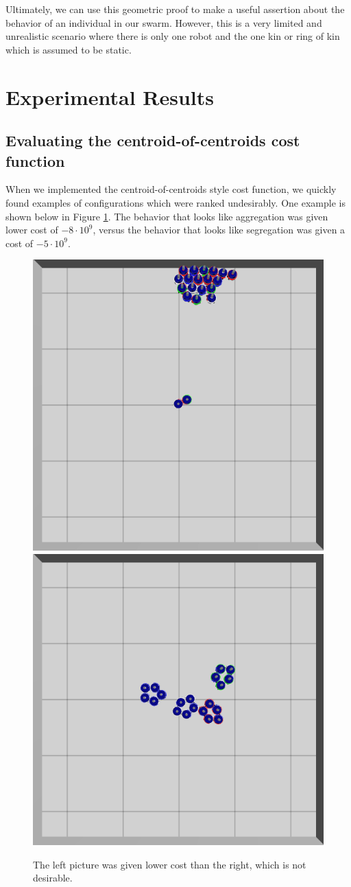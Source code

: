 \documentclass[conference]{IEEEtran}
\begin{document}
    Ultimately, we can use this geometric proof to make a useful assertion about the behavior of an individual in our swarm. However, this is a very limited and unrealistic scenario where there is only one robot and the one kin or ring of kin which is assumed to be static.

\section{Experimental Results}

  \subsection{Evaluating the centroid-of-centroids cost function} \label{section:evaluting_cost_functions}

    When we implemented the centroid-of-centroids style cost function, we quickly found examples of configurations which were ranked undesirably. One example is shown below in Figure \ref{fig:cost_function_fuckup}. The behavior that looks like aggregation was given lower cost of $-8\cdot 10^{9}$, versus the behavior that looks like segregation was given a cost of $-5\cdot 10^{9}$.

    \begin{figure}[H]
      \centering
      \includegraphics[width=0.49\linewidth]{./images/individual_0_gen_0.png}
      \includegraphics[width=0.49\linewidth]{./images/individual_0_gen_1_better.png}
      \caption{The left picture was given lower cost than the right, which is not desirable.}
      \label{fig:cost_function_fuckup}
    \end{figure}
\end{document}
